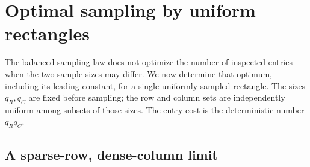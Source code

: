 \section{Optimal sampling by uniform rectangles}
\label{sec:rectangles}

The balanced sampling law does not optimize the number of inspected
entries when the two sample sizes may differ. We now determine that
optimum, including its leading constant, for a single uniformly sampled
rectangle. The sizes \(q_R,q_C\) are fixed before sampling; the row and
column sets are independently uniform among subsets of those sizes.
The entry cost is the deterministic number \(q_Rq_C\).

\subsection{A sparse-row, dense-column limit}

